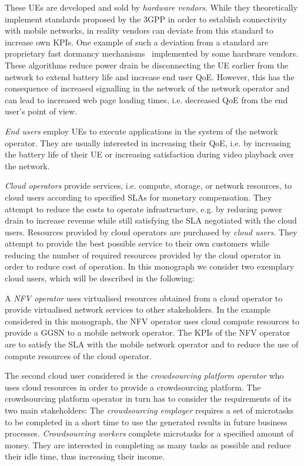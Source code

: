 These \glspl{UE} are developed and sold by \emph{hardware vendors}.
While they theoretically implement standards proposed by the \gls{3GPP} in order to establish connectivity with mobile networks, in reality vendors can deviate from this standard to increase own \glspl{KPI}.
One example of such a deviation from a standard are proprietary fast dormancy mechanisms~\cite{GSM2010} implemented by some hardware vendors.
These algorithms reduce power drain be disconnecting the \gls{UE} earlier from the network to extend battery life and increase end user \gls{QoE}.
However, this has the consequence of increased signalling in the network of the network operator and can lead to increased web page loading times, i.e. decreased \gls{QoE} from the end user's point of view.

\emph{End users} employ \glspl{UE} to execute applications in the system of the network operator. 
They are usually interested in increasing their \gls{QoE}, i.e. by increasing the battery life of their \gls{UE} or increasing satisfaction during video playback over the network.

\emph{Cloud operators} provide services, i.e. compute, storage, or network resources, to cloud users according to specified \glspl{SLA} for monetary compensation. 
They attempt to reduce the costs to operate infrastructure, e.g. by reducing power drain to increase revenue while still satisfying the \gls{SLA} negotiated with the cloud users.
Resources provided by cloud operators are purchased by \emph{cloud users}.
They attempt to provide the best possible service to their own customers while reducing the number of required resources provided by the cloud operator in order to reduce cost of operation. In this monograph we consider two exemplary cloud users, which will be described in the following:

A \emph{\gls{NFV} operator} uses virtualised resources obtained from a cloud operator to provide virtualised network services to other stakeholders.
In the example considered in this monograph, the \gls{NFV} operator uses cloud compute resources to provide a \gls{GGSN} to a mobile network operator.
The \glspl{KPI} of the \gls{NFV} operator are to satisfy the \gls{SLA} with the mobile network operator and to reduce the use of compute resources of the cloud operator.

The second cloud user considered is the \emph{crowdsourcing platform operator} who uses cloud resources in order to provide a crowdsourcing platform.
The crowdsourcing platform operator in turn has to consider the requirements of its two main stakeholders:
The \emph{crowdsourcing employer} requires a set of microtasks to be completed in a short  time to use the generated results in future business processes. 
\emph{Crowdsourcing workers} complete microtasks for a specified amount of money.
They are interested in completing as many tasks as possible and reduce their idle time, thus increasing their income.

